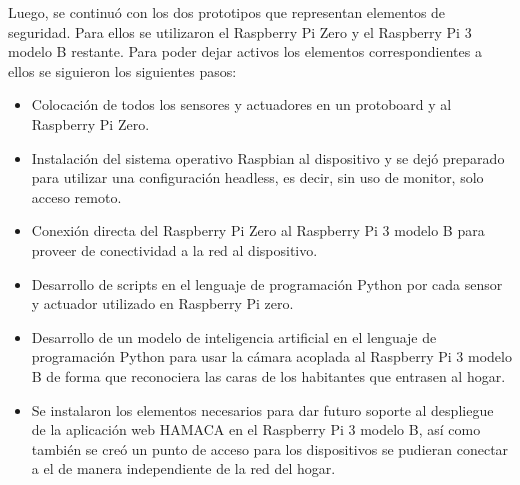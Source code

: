 Luego, se continuó con los dos prototipos que representan elementos de seguridad. Para ellos se utilizaron el Raspberry Pi Zero y el Raspberry Pi 3 modelo B restante. Para poder dejar activos los elementos correspondientes a ellos se siguieron los siguientes pasos:
\begin{itemize}
\item  Colocación de todos los sensores y actuadores en un protoboard y al  Raspberry Pi Zero.

\item Instalación del sistema operativo Raspbian al dispositivo y se dejó preparado para utilizar una configuración headless, es decir, sin uso de monitor, solo acceso remoto.

\item Conexión directa del Raspberry Pi Zero al Raspberry Pi 3 modelo B para proveer de conectividad a la red al dispositivo. 

\item Desarrollo de scripts en el lenguaje de programación Python por cada sensor y actuador utilizado en Raspberry Pi zero.

\item Desarrollo de un modelo de inteligencia artificial en el lenguaje de programación Python para usar la cámara acoplada al Raspberry Pi 3 modelo B de forma que reconociera las caras de los habitantes que entrasen al hogar.  

\item Se instalaron los elementos necesarios para dar futuro soporte al despliegue de la aplicación web HAMACA en el Raspberry Pi 3 modelo B, así como también se creó un punto de acceso para los dispositivos se pudieran conectar a el de manera independiente de la red del hogar. 
\end{itemize}

